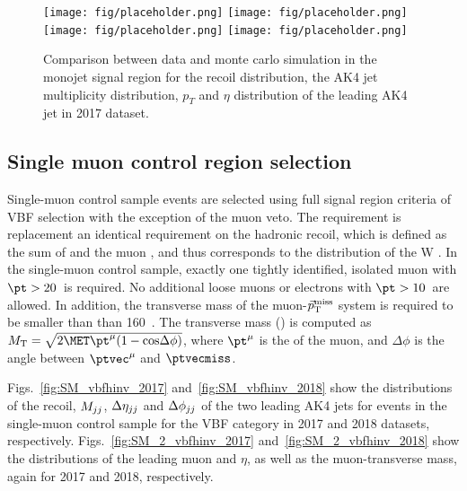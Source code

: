 \begin{figure}[htbp]
    \begin{center}
        \texttt{[image: fig/placeholder.png]}
        \texttt{[image: fig/placeholder.png]} \\
        \texttt{[image: fig/placeholder.png]}
        \texttt{[image: fig/placeholder.png]}
    \end{center}
    \caption{Comparison between data and monte carlo simulation in the monojet signal region for
        the recoil distribution, the AK4 jet multiplicity distribution,  $p_T$ and $\eta$
        distribution of the leading AK4  jet in 2017 dataset.}
    \label{fig:SR_pre_monoV_2018}
\end{figure}

\newpage

\subsection{Single muon control region selection}
\label{sec:selection_cr_1m}

Single-muon control sample events are selected using full signal region criteria of VBF selection with the exception of the muon veto. 
The \ptmiss requirement is replacement an identical requirement on the hadronic recoil, which is defined as the sum of \ptvecmiss and the muon \vpt, 
and thus corresponds to the distribution of the W \pt.
In the single-muon control sample, exactly one tightly identified, isolated muon with $\pt > 20$~\GeV is required. 
No additional loose muons or electrons with $\pt > 10$~\GeV are allowed.
In addition, the transverse mass of the muon-$\vec p_{\rm T}^{\rm miss}$ system is required to be smaller than than 160~\GeV.
The transverse mass (\mt) is computed as $\mt = \sqrt{2\MET \pt^{\mu} (1 - \mathrm{cos}\Delta\phi)}$, 
where $\pt^{\mu}$ is the \pt of the muon, and $\Delta\phi$ is the angle between $\ptvec^{\mu}$ and $\ptvecmiss$.


Figs.~\ref{fig:SM_vbfhinv_2017} and~\ref{fig:SM_vbfhinv_2018} show the distributions of the recoil, 
$M_{jj}$, $\Delta \eta_{jj}$ and $\Delta \phi_{jj}$ of the two leading AK4 jets
for events in the single-muon control sample for the VBF category in 2017 and 2018 datasets, respectively. 
Figs.~\ref{fig:SM_2_vbfhinv_2017} and~\ref{fig:SM_2_vbfhinv_2018} show the distributions of the leading muon \pt and $\eta$, 
as well as the muon-\ptmiss transverse mass, again for 2017 and 2018, respectively. 

